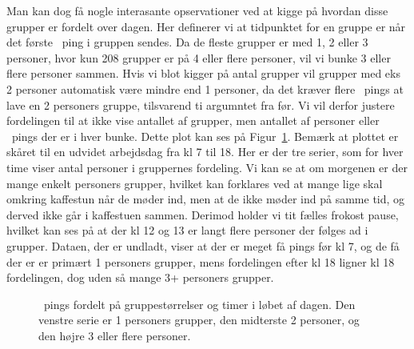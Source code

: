 \begin{article}
Man kan dog få nogle interasante opservationer ved at kigge på hvordan disse grupper er fordelt over dagen. Her definerer vi at tidpunktet for en gruppe er når det første \coffee\ ping i gruppen sendes. Da de fleste grupper er med 1, 2 eller 3 personer, hvor kun 208 grupper er på 4 eller flere personer, vil vi bunke 3 eller flere personer sammen. Hvis vi blot kigger på antal grupper vil grupper med eks 2 personer automatisk være mindre end 1 personer, da det kræver flere \coffee\ pings at lave en 2 personers gruppe, tilsvarend ti argumntet fra før. Vi vil derfor justere fordelingen til at ikke vise antallet af grupper, men antallet af personer eller \coffee\ pings der er i hver bunke. Dette plot kan ses på Figur~\ref{fig:group_size_by_hour}.
Bemærk at plottet er skåret til en udvidet arbejdsdag fra kl 7 til 18. Her er der tre serier, som for hver time viser antal personer i gruppernes fordeling.
Vi kan se at om morgenen er der mange enkelt personers grupper, hvilket kan forklares ved at mange lige skal omkring kaffestun når de møder ind, men at de ikke møder ind på samme tid, og derved ikke går i kaffestuen sammen. Derimod holder vi tit fælles frokost pause, hvilket kan ses på at der kl 12 og 13 er langt flere personer der følges ad i grupper.
Dataen, der er undladt, viser at der er meget få pings før kl 7, og de få der er er primært 1 personers grupper, mens fordelingen efter kl 18 ligner kl 18 fordelingen, dog uden så mange 3+ personers grupper.

\begin{figure}[H]
	\centering
	\resizebox{\columnwidth}{!}{}
	\vspace{-25pt}
	\caption{\protect\coffee\ pings fordelt på gruppestørrelser og timer i løbet af dagen. Den venstre serie er 1 personers grupper, den midterste 2 personer, og den højre 3 eller flere personer.}
	\label{fig:group_size_by_hour}
\end{figure}



\end{article}
